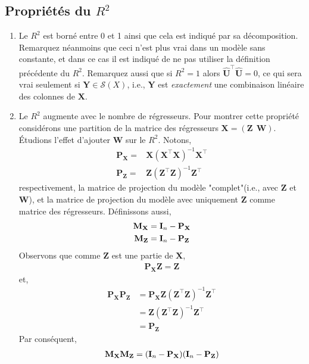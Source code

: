 \subsection{Propriétés du $R^2$}
\begin{enumerate}
\item Le $R^2$ est borné entre 0 et 1 ainsi que cela est indiqué par sa décomposition. Remarquez néanmoins que ceci n'est plus vrai dans un modèle sans constante, et dans ce cas il est indiqué de ne pas utiliser la définition précédente du $R^2$. Remarquez aussi que si $R^2 =  1$ alors $\widehat{\mathbf{U}}^\top\widehat{\mathbf{U}} = 0$, ce qui sera vrai seulement si $\mathbf{Y}\in \mathcal{S}(X)$, i.e., $\mathbf{Y}$ est \emph{exactement} une combinaison linéaire des colonnes de $\mathbf{X}$.
\item Le $R^2$ augmente avec le nombre de régresseurs. Pour montrer cette propriété considérons une partition de la matrice des régresseurs $\mathbf{X} = (\mathbf{Z} \ \ \mathbf{W})$. \'Etudions l'effet d'ajouter $\mathbf{W}$ sur le $R^2$. Notons,
\begin{align*}
\mathbf{P}_\mathbf{X} = &\mathbf{X}(\mathbf{X}^\top\mathbf{X})^{-1}\mathbf{X}^\top\\
\mathbf{P}_\mathbf{Z} = &\mathbf{Z}(\mathbf{Z}^\top\mathbf{Z})^{-1}\mathbf{Z}^\top
\end{align*}
respectivement, la matrice de projection du modèle "complet"(i.e., avec $\mathbf{Z}$ et $\mathbf{W}$), et la matrice de projection du modèle avec uniquement $\mathbf{Z}$ comme matrice des régresseurs. Définissons aussi,
\begin{align*}
\mathbf{M}_\mathbf{X}  &= \mathbf{I}_n - \mathbf{P}_\mathbf{X}\\
\mathbf{M}_\mathbf{Z} &= \mathbf{I}_n - \mathbf{P}_\mathbf{Z}
\end{align*}
Observons que comme $\mathbf{Z}$ est une partie de $\mathbf{X}$,
\begin{align*}
\mathbf{P}_\mathbf{X}  \mathbf{Z} = \mathbf{Z}
\end{align*}
et,
\begin{align*}
\mathbf{P}_\mathbf{X}\mathbf{P}_\mathbf{Z} &= \mathbf{P}_\mathbf{X} \mathbf{Z}(\mathbf{Z}^\top\mathbf{Z})^{-1}\mathbf{Z}^\top\\
& = \mathbf{Z}(\mathbf{Z}^\top\mathbf{Z})^{-1}\mathbf{Z}^\top \\
&= \mathbf{P}_\mathbf{Z}
\end{align*}
Par conséquent,
\begin{align*}
\mathbf{M}_\mathbf{X}\mathbf{M}_\mathbf{Z}& = (\Id_n - \mathbf{P}_\mathbf{X})(\Id_n - \mathbf{P}_\mathbf{Z})\\

\end{align*}
\end{enumerate}
